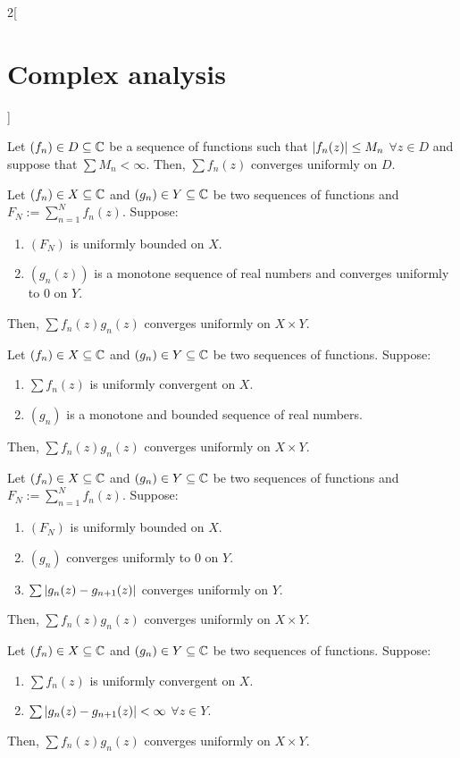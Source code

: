 \documentclass[../../../main.tex]{subfiles}
\begin{document}
\begin{multicols}{2}[\section{Complex analysis}]
\begin{theorem}
    Let $(f_n)\in D\subseteq\mathbb{C}$ be a sequence of functions such that $\abs{f_n(z)}\leq M_n$ $\forall z\in D$ and suppose that $\sum M_n<\infty$. Then, $\sum f_n(z)$ converges uniformly on $D$.
  \end{theorem}
  \begin{theorem}
    Let $(f_n)\in X\subseteq \mathbb{C}$ and $(g_n)\in Y\subseteq \mathbb{C}$ be two sequences of functions and $F_N:=\sum_{n=1}^Nf_n(z)$. Suppose:
    \begin{enumerate}
      \item $(F_N)$ is uniformly bounded on $X$.
      \item $(g_n(z))$ is a monotone sequence of real numbers and converges uniformly to 0 on $Y$.
    \end{enumerate}
    Then, $\sum f_n(z)g_n(z)$ converges uniformly on $X\times Y$.
  \end{theorem}
  \begin{theorem}
    Let $(f_n)\in X\subseteq \mathbb{C}$ and $(g_n)\in Y\subseteq \mathbb{C}$ be two sequences of functions. Suppose:
    \begin{enumerate}
      \item $\sum f_n(z)$ is uniformly convergent on $X$.
      \item $(g_n)$ is a monotone and bounded sequence of real numbers.
    \end{enumerate}
    Then, $\sum f_n(z)g_n(z)$ converges uniformly on $X\times Y$.
  \end{theorem}
  \begin{theorem}
    Let $(f_n)\in X\subseteq \mathbb{C}$ and $(g_n)\in Y\subseteq \mathbb{C}$ be two sequences of functions and $F_N:=\sum_{n=1}^Nf_n(z)$. Suppose:
    \begin{enumerate}
      \item $(F_N)$ is uniformly bounded on $X$.
      \item $(g_n)$ converges uniformly to 0 on $Y$.
      \item $\sum\abs{g_n(z)-g_{n+1}(z)}$ converges uniformly on $Y$.
    \end{enumerate}
    Then, $\sum f_n(z)g_n(z)$ converges uniformly on $X\times Y$.
  \end{theorem}
  \begin{theorem}
    Let $(f_n)\in X\subseteq \mathbb{C}$ and $(g_n)\in Y\subseteq \mathbb{C}$ be two sequences of functions. Suppose:
    \begin{enumerate}
      \item $\sum f_n(z)$ is uniformly convergent on $X$.
      \item $\sum\abs{g_n(z)-g_{n+1}(z)}<\infty$ $\forall z\in Y$.
    \end{enumerate}
    Then, $\sum f_n(z)g_n(z)$ converges uniformly on $X\times Y$.
  \end{theorem}

\end{multicols}
\end{document}
